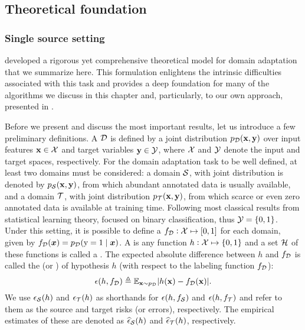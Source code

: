 \subsection{Theoretical foundation}
\label{sec:da_theory}

\subsubsection{Single source setting}
\label{sec:da_theory_ss}
\citet{BenDavid2010} developed a rigorous yet comprehensive theoretical model for domain adaptation that we summarize here. This formulation enlightens the intrinsic difficulties associated with this task and provides a deep foundation for many of the algorithms we discuss in this chapter and, particularly, to our own approach, presented in .

Before we present and discuss the most important results, let us introduce a few preliminary definitions. A  ${\mathcal{D}}$ is defined by a joint distribution $p_{\mathcal{D}}({\mathbf{x}}, {\mathbf{y}})$ over input features ${\mathbf{x}} \in {\mathcal{X}}$ and target variables ${\mathbf{y}} \in {\mathcal{Y}}$, where ${\mathcal{X}}$ and ${\mathcal{Y}}$ denote the input and target spaces, respectively. For the domain adaptation task to be well defined, at least two domains must be considered: a  domain ${\mathcal{S}}$, with joint distribution is denoted by $p_{\mathcal{S}}({\mathbf{x}}, {\mathbf{y}})$, from which abundant annotated data is usually available, and a  domain ${\mathcal{T}}$, with joint distribution $p_{\mathcal{T}}({\mathbf{x}}, {\mathbf{y}})$, from which scarce or even zero annotated data is available at training time. Following most classical results from statistical learning theory, \citet{BenDavid2010} focused on binary classification, thus ${\mathcal{Y}} = \{0, 1\}$. Under this setting, it is possible to define a  $f_{\mathcal{D}}: {\mathcal{X}} \mapsto [0, 1]$ for each domain, given by $f_{\mathcal{D}}({\bm{x}}) = p_{\mathcal{D}}({\textnormal{y}}=1 \mid {\bm{x}})$. A  is any function $h: {\mathcal{X}} \mapsto \{0,1\}$ and a set ${\mathcal{H}}$ of these functions is called a . The expected absolute difference between $h$ and $f_{\mathcal{D}}$ is called the  (or ) of hypothesis $h$ (with respect to the labeling function $f_{\mathcal{D}}$):
\begin{equation}
	\epsilon(h,f_{\mathcal{D}}) \triangleq \mathbb{E}_{{\mathbf{x}} \sim p_{\mathcal{D}}} |h({\mathbf{x}}) - f_{\mathcal{D}}({\mathbf{x}})|.
\end{equation}
We use $\epsilon_{\mathcal{S}}(h)$ and $\epsilon_{\mathcal{T}}(h)$ as shorthands for $\epsilon(h,f_{\mathcal{S}})$ and $\epsilon(h,f_{\mathcal{T}})$ and refer to them as the source and target risks (or errors), respectively. The empirical estimates of these are denoted as $\widehat{\epsilon}_{\mathcal{S}}(h)$ and $\widehat{\epsilon}_{\mathcal{T}}(h)$, respectively.

